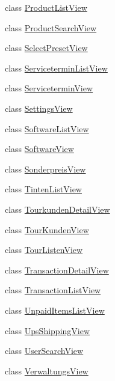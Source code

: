 \begin{DoxyCompactItemize}
class \hyperlink{class_products_1_1_common_1_1_views_1_1_product_list_view}{Product\+List\+View}
\item 
class \hyperlink{class_products_1_1_common_1_1_views_1_1_product_search_view}{Product\+Search\+View}
\item 
class \hyperlink{class_products_1_1_common_1_1_views_1_1_select_preset_view}{Select\+Preset\+View}
\item 
class \hyperlink{class_products_1_1_common_1_1_views_1_1_servicetermin_list_view}{Servicetermin\+List\+View}
\item 
class \hyperlink{class_products_1_1_common_1_1_views_1_1_servicetermin_view}{Servicetermin\+View}
\item 
class \hyperlink{class_products_1_1_common_1_1_views_1_1_settings_view}{Settings\+View}
\item 
class \hyperlink{class_products_1_1_common_1_1_views_1_1_software_list_view}{Software\+List\+View}
\item 
class \hyperlink{class_products_1_1_common_1_1_views_1_1_software_view}{Software\+View}
\item 
class \hyperlink{class_products_1_1_common_1_1_views_1_1_sonderpreis_view}{Sonderpreis\+View}
\item 
class \hyperlink{class_products_1_1_common_1_1_views_1_1_tinten_list_view}{Tinten\+List\+View}
\item 
class \hyperlink{class_products_1_1_common_1_1_views_1_1_tourkunden_detail_view}{Tourkunden\+Detail\+View}
\item 
class \hyperlink{class_products_1_1_common_1_1_views_1_1_tour_kunden_view}{Tour\+Kunden\+View}
\item 
class \hyperlink{class_products_1_1_common_1_1_views_1_1_tour_listen_view}{Tour\+Listen\+View}
\item 
class \hyperlink{class_products_1_1_common_1_1_views_1_1_transaction_detail_view}{Transaction\+Detail\+View}
\item 
class \hyperlink{class_products_1_1_common_1_1_views_1_1_transaction_list_view}{Transaction\+List\+View}
\item 
class \hyperlink{class_products_1_1_common_1_1_views_1_1_unpaid_items_list_view}{Unpaid\+Items\+List\+View}
\item 
class \hyperlink{class_products_1_1_common_1_1_views_1_1_ups_shipping_view}{Ups\+Shipping\+View}
\item 
class \hyperlink{class_products_1_1_common_1_1_views_1_1_user_search_view}{User\+Search\+View}
\item 
class \hyperlink{class_products_1_1_common_1_1_views_1_1_verwaltungs_view}{Verwaltungs\+View}
\end{DoxyCompactItemize}
